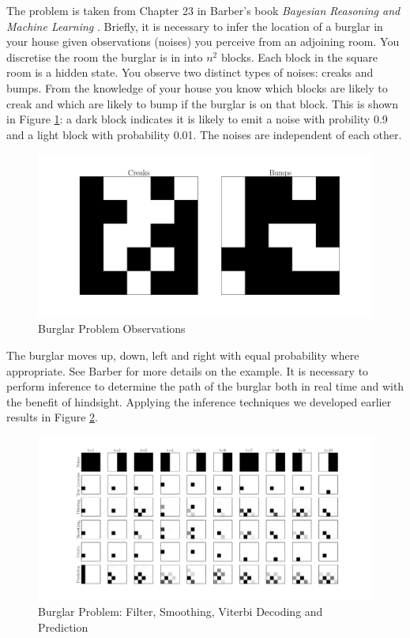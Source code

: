 \documentclass[../masters.tex]{subfiles}
\begin{document}
The problem is taken from Chapter 23 in Barber's book \textit{Bayesian Reasoning and Machine Learning} \cite{barber}. Briefly, it is necessary to infer the location of a burglar in your house given observations (noises) you perceive from an adjoining room. You discretise the room the burglar is in into $n^2$ blocks. Each block in the square room is a hidden state. You observe two distinct types of noises: creaks and bumps. From the knowledge of your house you know which blocks are likely to creak and which are likely to bump if the burglar is on that block. This is shown in Figure \ref{fig_burlgar_observations}: a dark block indicates it is likely to emit a noise with probility 0.9 and a light block with probability 0.01. The noises are independent of each other.
\begin{figure}[H] 
\centering
\includegraphics[scale=0.20]{burglar_observations.pdf}
\caption{Burglar Problem Observations}
\label{fig_burlgar_observations}
\end{figure}
The burglar moves up, down, left and right with equal probability where appropriate. See Barber for more details on the example. It is necessary to perform inference to determine the path of the burglar both in real time and with the benefit of hindsight. Applying the inference techniques we developed earlier results in Figure \ref{fig_burglar_inference}. 
\begin{figure}[H] 
\centering
\includegraphics[scale=0.29]{burglar_inference.pdf}
\caption{Burglar Problem: Filter, Smoothing, Viterbi Decoding and Prediction}
\label{fig_burglar_inference}
\end{figure}
\end{document}
